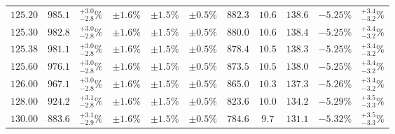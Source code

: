 \begin{table}[ht!]
{{\begin{tabular}{| cc | c | ccc | cccc | c |}
$125.20$ & $985.1$ & $^{+3.0}_{-2.8}\%$ & $\pm 1.6\%$ & {\color{black!55}$\pm 1.5\%$} & {\color{black!55}$\pm 0.5\%$} & $882.3$ & $10.6$ & $138.6$ & $-5.25\%$ & $^{+3.4}_{-3.2}\%$ \\
$125.30$ & $982.8$ & $^{+3.0}_{-2.8}\%$ & $\pm 1.6\%$ & {\color{black!55}$\pm 1.5\%$} & {\color{black!55}$\pm 0.5\%$} & $880.0$ & $10.6$ & $138.4$ & $-5.25\%$ & $^{+3.4}_{-3.2}\%$ \\
$125.38$ & $981.1$ & $^{+3.0}_{-2.8}\%$ & $\pm 1.6\%$ & {\color{black!55}$\pm 1.5\%$} & {\color{black!55}$\pm 0.5\%$} & $878.4$ & $10.5$ & $138.3$ & $-5.25\%$ & $^{+3.4}_{-3.2}\%$ \\
$125.60$ & $976.1$ & $^{+3.0}_{-2.8}\%$ & $\pm 1.6\%$ & {\color{black!55}$\pm 1.5\%$} & {\color{black!55}$\pm 0.5\%$} & $873.5$ & $10.5$ & $138.0$ & $-5.25\%$ & $^{+3.4}_{-3.2}\%$ \\
$126.00$ & $967.1$ & $^{+3.0}_{-2.8}\%$ & $\pm 1.6\%$ & {\color{black!55}$\pm 1.5\%$} & {\color{black!55}$\pm 0.5\%$} & $865.0$ & $10.3$ & $137.3$ & $-5.26\%$ & $^{+3.4}_{-3.2}\%$ \\
$128.00$ & $924.2$ & $^{+3.1}_{-2.8}\%$ & $\pm 1.6\%$ & {\color{black!55}$\pm 1.5\%$} & {\color{black!55}$\pm 0.5\%$} & $823.6$ & $10.0$ & $134.2$ & $-5.29\%$ & $^{+3.5}_{-3.3}\%$ \\
$130.00$ & $883.6$ & $^{+3.1}_{-2.9}\%$ & $\pm 1.6\%$ & {\color{black!55}$\pm 1.5\%$} & {\color{black!55}$\pm 0.5\%$} & $784.6$ & $9.7$ & $131.1$ & $-5.32\%$ & $^{+3.5}_{-3.3}\%$ \\
\cline{1-11}
\end{tabular}
}
}
\end{table}

\FloatBarrier
